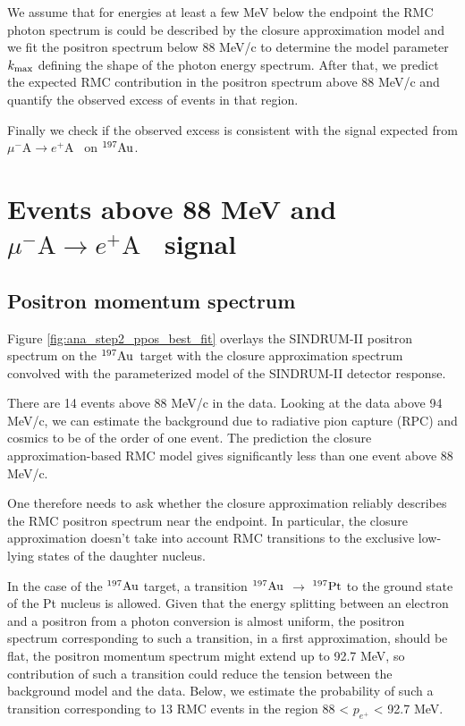 \documentclass[12pt]{article}
\newcommand {\ra}        {\rightarrow}
\newcommand {\mumepconv}[1][A] {%
  \def\ArgI{{#1}}%
  \mumepconvRelay
}
\newcommand \mumepconvRelay[1][A]  {\mbox{$\mu^- \textrm{\ArgI} \rightarrow e^+ \textrm{#1}$}}
\newcommand {\Au}[1]     {\mbox{$\rm ^{#1}Au$}}                 %
\newcommand {\kmax}      {\mbox{$k_{\rm max}$}}
\begin{document}
We assume that for energies at least a few MeV below the endpoint the RMC photon
spectrum is could be described by the closure approximation model and we fit the
positron spectrum below 88 MeV/c to determine the model parameter $\kmax$ defining
the shape of the photon energy spectrum. After that, we predict the expected 
RMC contribution in the positron spectrum above 88 MeV/c and quantify the observed
excess of events in that region.

Finally we check if the observed excess is consistent with the signal expected from
\mumepconv\ on \Au{197}.










\newpage
\section {Events above 88 MeV and \mumepconv\ signal}
\subsection {Positron momentum spectrum}

Figure \ref{fig:ana_step2_ppos_best_fit} overlays the SINDRUM-II positron spectrum
on the \Au{197}\ target with the closure approximation spectrum convolved with the 
parameterized model of the SINDRUM-II detector response.

There are 14 events above 88 MeV/c in the data. Looking at the data above 94 MeV/c,
we can estimate the background due to radiative pion capture (RPC) and cosmics to be
of the order of one event. The prediction the closure approximation-based RMC model
gives significantly less than one event above 88 MeV/c. 

One therefore needs to ask whether the closure approximation reliably describes
the RMC positron spectrum near the endpoint. In particular, the closure approximation
doesn't take into account RMC transitions to the exclusive low-lying states of the 
daughter nucleus.

In the case of the \Au{197} target, a transition \Au{197} $\ra$ $^{197} \rm Pt$ to
the ground state of the Pt nucleus is allowed. Given that the energy splitting between
an electron and a positron from a photon conversion is almost uniform,
the positron spectrum corresponding to such a transition, in a first approximation,
should be flat, the positron momentum spectrum might extend up to 92.7 MeV, so contribution
of such a transition could reduce the tension between the background model and the data.
Below, we estimate the probability of such a transition corresponding to 13 RMC events
in the region 88 < $p_{e^+}$ < 92.7 MeV.
\end{document}
